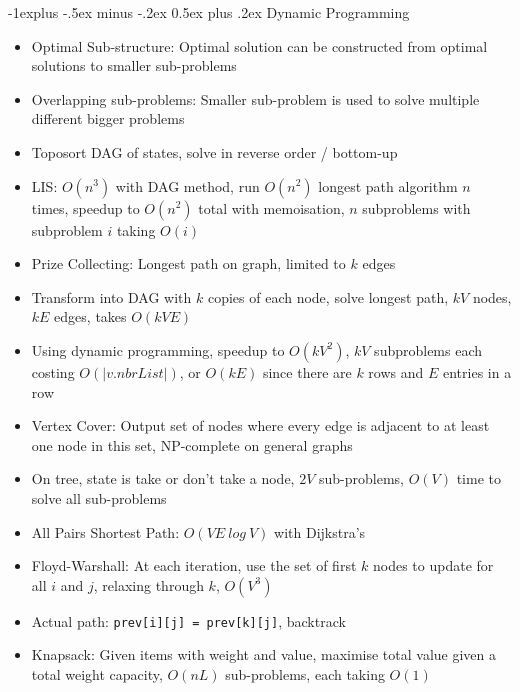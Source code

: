 \documentclass[10pt, landscape]{article}
\makeatletter
\renewcommand{\section}{\@startsection{section}{1}{0mm}%
                                {-1ex plus -.5ex minus -.2ex}%
                                {0.5ex plus .2ex}%
                                {\normalfont\large\bfseries}}
\renewcommand{\section}{\@startsection{section}{2}{0mm}%
                                {-1explus -.5ex minus -.2ex}%
                                {0.5ex plus .2ex}%
                                {\normalfont\normalsize\bfseries}}
\makeatother
\begin{document}
\begin{multicols*}{4}
\section{Dynamic Programming}
\begin{itemize}
    \item Optimal Sub-structure: Optimal solution can be constructed from optimal solutions to smaller sub-problems
    \item Overlapping sub-problems: Smaller sub-problem is used to solve multiple different bigger problems
    \item Toposort DAG of states, solve in reverse order / bottom-up
    \item LIS: $O(n^3)$ with DAG method, run $O(n^2)$ longest path algorithm $n$ times, speedup to $O(n^2)$ total with memoisation, $n$ subproblems with subproblem $i$ taking $O(i)$
    \item Prize Collecting: Longest path on graph, limited to $k$ edges
    \item Transform into DAG with $k$ copies of each node, solve longest path, $kV$ nodes, $kE$ edges, takes $O(kVE)$
    \item Using dynamic programming, speedup to $O(kV^2)$, $kV$ subproblems each costing $O(|v.nbrList|)$, or $O(kE)$ since there are $k$ rows and $E$ entries in a row
    \item Vertex Cover: Output set of nodes where every edge is adjacent to at least one node in this set, NP-complete on general graphs
    \item On tree, state is take or don't take a node, $2V$ sub-problems, $O(V)$ time to solve all sub-problems
    \item All Pairs Shortest Path: $O(VE\ log \ V)$ with Dijkstra's
    \item Floyd-Warshall: At each iteration, use the set of first $k$ nodes to update for all $i$ and $j$, relaxing through $k$, $O(V^3)$
    \item Actual path: \verb|prev[i][j] = prev[k][j]|, backtrack
    \item Knapsack: Given items with weight and value, maximise total value given a total weight capacity, $O(nL)$ sub-problems, each taking $O(1)$
\end{itemize}

\end{multicols*}
\end{document}
